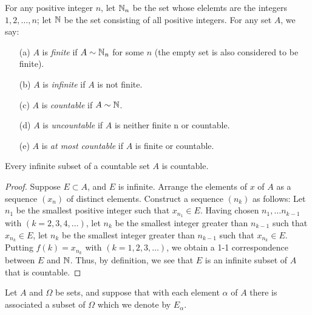 \documentclass[11pt,a4paper]{book}
\begin{document}
\begin{definition}
    For any positive integer \( n  \), let \( {\mathbb{N}}_{n}  \) be the set whose elelemts are the integers \( 1,2, \dots , n  \); let \( \mathbb{N}  \) be the set consisting of all positive integers. For any set \( A \), we say:
    \begin{enumerate}
        \item[(a)] \( A  \) is \textit{finite} if \( A \sim {\ensuremath{\mathbb{N}}}_{n} \) for some \( n  \) (the empty set is also considered to be finite).
        \item[(b)] \( A  \) is \textit{infinite} if \( A  \) is not finite. 
        \item[(c)] \( A  \) is \textit{countable}  if \( A \sim \mathbb{N}  \).
        \item[(d)] \( A  \) is \textit{uncountable} if \( A  \) is neither finite n or countable.
        \item[(e)] \( A  \) is \textit{at most countable} if \( A  \) is finite or countable.
    \end{enumerate}
\end{definition}

\begin{prop}\label{Infinite subsets of countable sets}
   Every infinite subset of a countable set \( A  \) is countable. 
\end{prop}
\begin{proof}
Suppose \( E \subset A   \), and \( E  \) is infinite. Arrange the elements of \( x  \) of \( A  \) as a sequence \( ({x}_{n}) \) of distinct elements. Construct a sequence \( ({n}_{k }) \) as follows:
Let \( {n}_{1} \) be the smallest positive integer such that \( {x}_{{n}_{1}} \in E  \). Having chosen \( {n}_{1}, \dots {n}_{k-1} \) with \( (k = 2,3,4, \dots) \), let \( {n}_{k } \) be the smallest integer greater than \( {n}_{k-1} \) such that \( {x}_{{n}_{k }} \in E  \), let \( {n}_{k } \) be the smallest integer greater than \( {n}_{k-1} \) such that \( {x}_{{n}_{k }} \in E  \). 
    Putting \( f(k) = {x}_{{n}_{k }}  \) with \( (k = 1,2,3,\dots) \), we obtain a 1-1 correspondence between \( E  \) and \( \mathbb{N}  \). Thus, by definition, we see that \( E  \) is an infinite subset of \( A  \) that is countable.
\end{proof}

\begin{definition}
    Let \( A  \) and \( \Omega \) be sets, and suppose that with each element \( \alpha  \) of \( A  \) there is associated a subset of \( \Omega  \) which we denote by \( {E}_{\alpha} \).
\end{definition}
\end{document}
